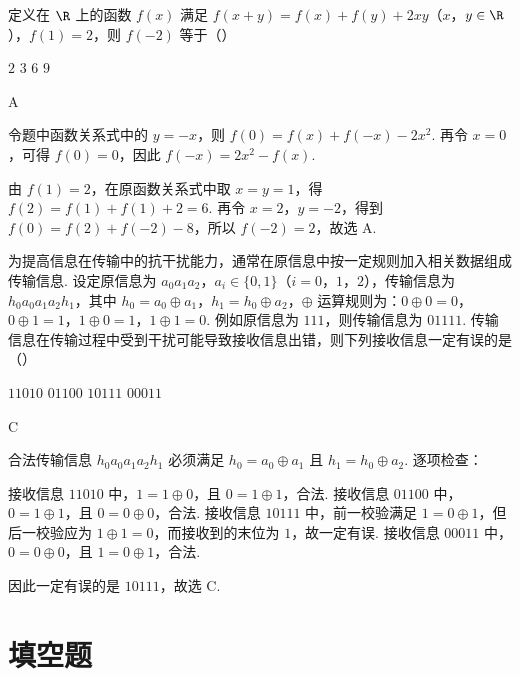 \begin{problem}
定义在 \(\R\) 上的函数 \(f(x)\) 满足 \(f(x + y) = f(x) + f(y) + 2xy\)（\(x\)，\(y \in \R\)），\(f(1) = 2\)，则 \(f(-2)\) 等于（\quad）

\choices
    {\(2\)}
    {\(3\)}
    {\(6\)}
    {\(9\)}
\end{problem}

\begin{answer}
A
\end{answer}

\begin{solution}
令题中函数关系式中的 \(y=-x\)，则
\(f(0)=f(x)+f(-x)-2x^2\). 再令 \(x=0\)，可得 \(f(0)=0\)，因此
\(f(-x)=2x^2-f(x)\).

由 \(f(1)=2\)，在原函数关系式中取 \(x=y=1\)，得
\(f(2)=f(1)+f(1)+2=6\). 再令 \(x=2\)，\(y=-2\)，得到
\(f(0)=f(2)+f(-2)-8\)，所以
\(f(-2)=2\)，故选 A.
\end{solution}

\begin{problem}
为提高信息在传输中的抗干扰能力，通常在原信息中按一定规则加入相关数据组成传输信息. 设定原信息为 \(a_0 a_1 a_2\)，\(a_i \in \{0, 1\}\)（\(i = 0\)，\(1\)，\(2\)），传输信息为 \(h_0 a_0 a_1 a_2 h_1\)，其中 \(h_0 = a_0 \oplus a_1\)，\(h_1 = h_0 \oplus a_2\)，\(\oplus\) 运算规则为：\(0 \oplus 0 = 0\)，\(0 \oplus 1 = 1\)，\(1 \oplus 0 = 1\)，\(1 \oplus 1 = 0\). 例如原信息为 \(111\)，则传输信息为 \(01111\). 传输信息在传输过程中受到干扰可能导致接收信息出错，则下列接收信息一定有误的是（\quad）

\choices
    {\(11010\)}
    {\(01100\)}
    {\(10111\)}
    {\(00011\)}
\end{problem}

\begin{answer}
C
\end{answer}

\begin{solution}
合法传输信息 \(h_0a_0a_1a_2h_1\) 必须满足
\(h_0=a_0\oplus a_1\) 且 \(h_1=h_0\oplus a_2\). 逐项检查：

接收信息 \(11010\) 中，\(1=1\oplus0\)，且 \(0=1\oplus1\)，合法.
接收信息 \(01100\) 中，\(0=1\oplus1\)，且 \(0=0\oplus0\)，合法.
接收信息 \(10111\) 中，前一校验满足 \(1=0\oplus1\)，但后一校验应为 \(1\oplus1=0\)，而接收到的末位为 \(1\)，故一定有误.
接收信息 \(00011\) 中，\(0=0\oplus0\)，且 \(1=0\oplus1\)，合法.

因此一定有误的是 \(10111\)，故选 C.
\end{solution}

\section{填空题}

